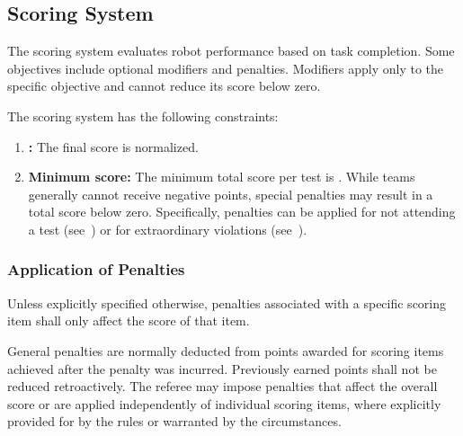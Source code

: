 \subsection{Scoring System}\label{rule:score_system}

The scoring system evaluates robot performance based on task completion. Some objectives include optional modifiers and penalties. Modifiers apply only to the specific objective and cannot reduce its score below zero.

The scoring system has the following constraints:
\begin{enumerate}
    \item \textbf{\FINAL:} The final score is normalized.
    \item \textbf{Minimum score:} The minimum total score per test is .
    While teams generally cannot receive negative points, special penalties may result in a total score below zero. Specifically, penalties can be applied for not attending a test (see~) or for extraordinary violations (see~).
\end{enumerate}

\subsubsection{Application of Penalties}

Unless explicitly specified otherwise, penalties associated with a specific scoring item shall only affect the score of that item.

General penalties are normally deducted from points awarded for scoring items achieved after the penalty was incurred. Previously earned points shall not be reduced retroactively. The referee may impose penalties that affect the overall score or are applied independently of individual scoring items, where explicitly provided for by the rules or warranted by the circumstances.